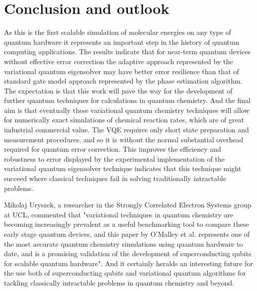 \documentclass[12pt]{article}
\begin{document}
\section{Conclusion and outlook}

As this is the first scalable simulation of molecular energies on any type of quantum hardware it represents an important step in the history of
quantum computing applications. The results indicate that for near-term quantum devices without effective error correction the adaptive approach
represented by the variational quantum eigensolver may have better error resilience than that of standard gate model approach represented by the
phase estimation algorithm. The expectation is that this work will pave the way for the development of further quantum techniques for calculations
 in quantum chemistry. And the final aim is that eventually these variational quantum chemistry techniques will allow for numerically exact simulations
  of chemical reaction rates, which are of great industrial commercial value. The VQE requires only short state preparation
 and measurement procedures, and so it is without the normal substantial overhead required for quantum error correction. This improves the efficiency
 and robustness to error displayed by the experimental implementation of the variational quantum eigensolver technique indicates that this technique
  might succeed where classical techniques fail in solving traditionally intractable problems.

 Mikolaj Uryszek, a researcher in the Strongly Correlated Electron Systems group at UCL, commented that "variational techniques in quantum chemistry
 are becoming increasingly prevalent as a useful benchmarking tool to compare these early stage quantum devices, and this paper by O’Malley et al.
 represents one of the most accurate quantum chemistry simulations using quantum hardware to date, and is a promising validation of the
  development of superconducting qubits for scalable quantum hardware". And it certainly heralds an interesting future for the use both of
  superconducting qubits and variational quantum algorithms for tackling classically intractable problems in quantum chemistry and beyond.
\end{document}
